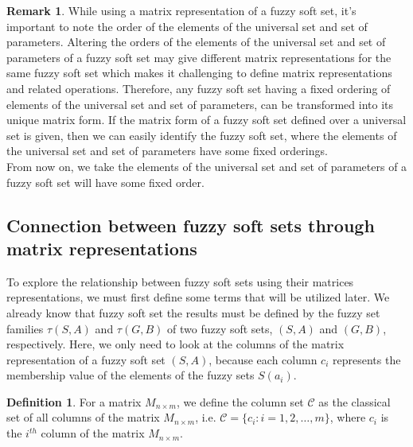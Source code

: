 \documentclass{article}
\theoremstyle{definition}
\newtheorem{definition}{Definition}[section]
\newtheorem{remark}{Remark}[section]
\begin{document}
  \begin{remark}
 While using a matrix representation of a fuzzy soft set, it's important to note the order of the elements of the universal set and set of parameters. Altering the orders of the elements of the universal set and set of parameters of a fuzzy soft set may give different matrix representations for the same fuzzy soft set which makes it challenging to define matrix representations and related operations. Therefore, any fuzzy soft set having a fixed ordering of elements of the universal set and set of parameters, can be transformed into its unique matrix form. If the matrix form of a fuzzy soft set defined over a universal set is given, then we can easily identify the fuzzy soft set, where the elements of the universal set and set of parameters have some fixed orderings.\\

     From now on, we take the elements of the universal set and set of parameters of a fuzzy soft set will have some fixed order.
     
   \end{remark}

\subsection{Connection between fuzzy soft sets through matrix representations}

To explore the relationship between fuzzy soft sets using their matrices representations, we must first define some terms that will be utilized later. We already know that fuzzy soft set the results must be defined by the fuzzy set families $\tau(S,A)$ and $\tau(G,B)$ of two fuzzy soft sets, $(S,A)$ and $(G,B)$, respectively. Here, we only need to look at the columns of the matrix representation of a fuzzy soft set $(S,A)$, because each column $c_i$ represents the membership value of the elements of the fuzzy sets $S(a_i)$. 


\begin{definition}
    For a matrix $M_{n\times m}$, we define the column set $\mathcal{C}$ as the classical set of all columns of the matrix $M_{n\times m}$, i.e. $\mathcal{C}=\{c_i : i=1, 2, \dots, m\}$, where $c_i$ is the $i^{th}$ column of the matrix $M_{n\times m}$.
\end{definition}
\end{document}
